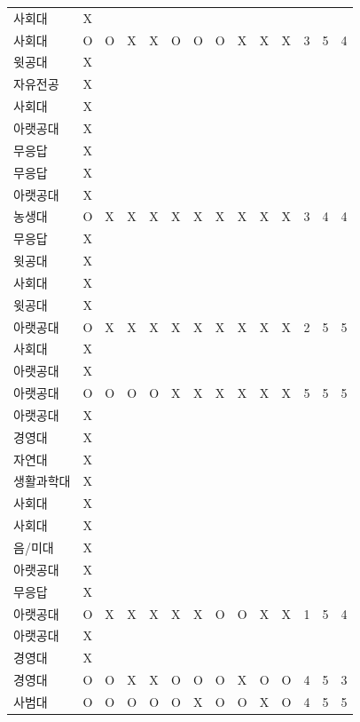 \documentclass[11pt,a4paper]{article}
\begin{document}
\begin{center}
\begin{supertabular}{ | p{2cm} | x{1.6cm} | x{0.5cm} | x{0.5cm} | x{0.5cm} | x{0.5cm} | x{0.5cm} | x{0.5cm} | x{0.5cm} | x{0.5cm} | x{0.5cm} | x{0.5cm} | x{0.5cm} | x{0.5cm} | }
사회대 & X & & & & & & & & & & & & \\
사회대 & O & O & X & X & O & O & O & X & X & X & 3 & 5 & 4 \\
윗공대 & X & & & & & & & & & & & & \\
자유전공 & X & & & & & & & & & & & & \\
사회대 & X & & & & & & & & & & & & \\
아랫공대 & X & & & & & & & & & & & & \\
무응답 & X & & & & & & & & & & & & \\
무응답 & X & & & & & & & & & & & & \\
아랫공대 & X & & & & & & & & & & & & \\
농생대 & O & X & X & X & X & X & X & X & X & X & 3 & 4 & 4 \\
무응답 & X & & & & & & & & & & & & \\
윗공대 & X & & & & & & & & & & & & \\
사회대 & X & & & & & & & & & & & & \\
윗공대 & X & & & & & & & & & & & & \\
아랫공대 & O & X & X & X & X & X & X & X & X & X & 2 & 5 & 5 \\
사회대 & X & & & & & & & & & & & & \\
아랫공대 & X & & & & & & & & & & & & \\
아랫공대 & O & O & O & O & X & X & X & X & X & X & 5 & 5 & 5 \\
아랫공대 & X & & & & & & & & & & & & \\
경영대 & X & & & & & & & & & & & & \\
자연대 & X & & & & & & & & & & & & \\
생활과학대 & X & & & & & & & & & & & & \\
사회대 & X & & & & & & & & & & & & \\
사회대 & X & & & & & & & & & & & & \\
음/미대 & X & & & & & & & & & & & & \\
아랫공대 & X & & & & & & & & & & & & \\
무응답 & X & & & & & & & & & & & & \\
아랫공대 & O & X & X & X & X & X & O & O & X & X & 1 & 5 & 4 \\
아랫공대 & X & & & & & & & & & & & & \\
경영대 & X & & & & & & & & & & & & \\
경영대 & O & O & X & X & O & O & O & X & O & O & 4 & 5 & 3 \\
사범대 & O & O & O & O & O & X & O & O & X & O & 4 & 5 & 5 \\

\end{supertabular}
\end{center}
\end{document}
